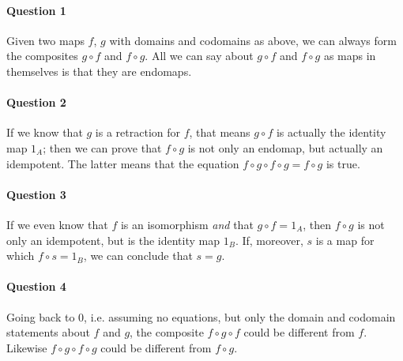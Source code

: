 \documentclass{report}
\begin{document}
    \paragraph{Question 1}
    Given two maps $f$, $g$ with domains and codomains as above, we can always form the composites
    $g \circ f$ and $f \circ g$. All we can say about $g \circ f$ and $f \circ g$ as maps in themselves is
    that they are endomaps.

    \paragraph{Question 2}
    If we know that $g$ is a retraction for $f$, that means $g \circ f$ is actually the identity map $1_A$;
    then we can prove that $f \circ g$ is not only an endomap, but actually an idempotent. The latter means
    that the equation $f \circ g \circ f \circ g = f \circ g$ is true.

    \paragraph{Question 3}
    If we even know that $f$ is an isomorphism \emph{and} that $g \circ f = 1_A$, then $f \circ g$ is not
    only an idempotent, but is the identity map $1_B$. If, moreover, $s$ is a map for which $f \circ s =
    1_B$, we can conclude that $s = g$.

    \paragraph{Question 4}
    Going back to 0, i.e. assuming no equations, but only the domain and codomain statements about $f$ and $g$,
    the composite $f \circ g \circ f$ could be different from $f$. Likewise $f \circ g \circ f \circ g$
    could be different from $f \circ g$.
\end{document}
